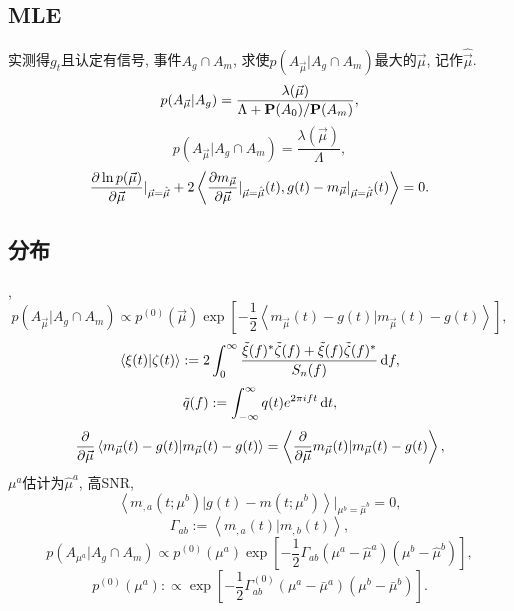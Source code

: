 \subsection{MLE}

实测得$g_t$且认定有信号, 事件$A_g\cap A_m$, 求使$p({A_{\vec{\mu}}}|A_g\cap A_m)$最大的$\vec{\mu}$, 记作$\hat{\vec{\mu}}$.
\begin{equation}
    p({A_{\vec{\mu}}}|A_g)=\frac{\lambda(\vec{\mu})}{\Lambda+\P(A_0)/\P(A_m)},
\end{equation}
\begin{equation}
    p({A_{\vec{\mu}}}|A_g\cap A_m)=\frac{\lambda(\vec{\mu})}{\Lambda},
\end{equation}
\begin{equation}
    \frac{\p\ln p(\vec{\mu})}{\p \vec{\mu}}|_{\vec{\mu}=\hat{\vec{\mu}}}+2\left\langle \frac{\p m_{\vec{\mu}}}{\p \vec{\mu}}|_{\vec{\mu}=\hat{\vec{\mu}}}(t),g(t)-m_{\vec{\mu}}|_{\vec{\mu}=\hat{\vec{\mu}}}(t)\right\rangle=0.
\end{equation}

\subsection{分布}

\cite{Poisson1995}, 
\begin{equation}
    p({A_{\vec{\mu}}}|A_g\cap A_m)\propto p^{(0)}(\vec{\mu})\exp[
        -\frac{1}{2}\left\langle 
            m_{\vec{\mu}}(t)-g(t)|m_{\vec{\mu}}(t)-g(t)
        \right\rangle 
    ],
\end{equation}
\begin{equation}
    \left\langle \xi(t)|\zeta(t)\right\rangle:=2\int_0^\infty\frac{\tilde{\xi}(f)^*\tilde{\zeta}(f)+\tilde{\xi}(f)\tilde{\zeta}(f)^*}{S_n(f)}\,\d f,
\end{equation}
\begin{equation}
    \tilde{q}(f):=\int_{-\infty}^{\infty}q(t)e^{2\pi ift}\,\d t,
\end{equation}
\begin{equation}
    \frac{\p}{\p\vec{\mu}}\left\langle 
        m_{\vec{\mu}}(t)-g(t)|m_{\vec{\mu}}(t)-g(t)
    \right\rangle =\left\langle \frac{\p }{\p \vec{\mu}}m_{\vec{\mu}}(t)|m_{\vec{\mu}}(t)-g(t)\right\rangle,
\end{equation}
$\mu^a$估计为$\hat{\mu}^a$, 高SNR,
\begin{equation}
    \left\langle m_{,a}(t;\mu^b)|g(t)-m(t;\mu^b)\right\rangle|_{\mu^b=\hat{\mu}^b}=0,
\end{equation}
\begin{equation}
    \Gamma_{ab}:=\left\langle m_{,a}(t)|m_{,b}(t)\right\rangle,
\end{equation}
\begin{equation}
    p({A_{\mu^a}}|A_g\cap A_m)\propto p^{(0)}({\mu^a})\exp[
        -\frac{1}{2}\Gamma_{ab}(\mu^a-\hat{\mu}^a)(\mu^b-\hat{\mu}^b)
    ],
\end{equation}
\begin{equation}
    p^{(0)}({\mu^a}):\propto\exp[
        -\frac{1}{2}\Gamma^{(0)}_{ab}(\mu^a-\bar{\mu}^a)(\mu^b-\bar{\mu}^b)
    ].
\end{equation}

